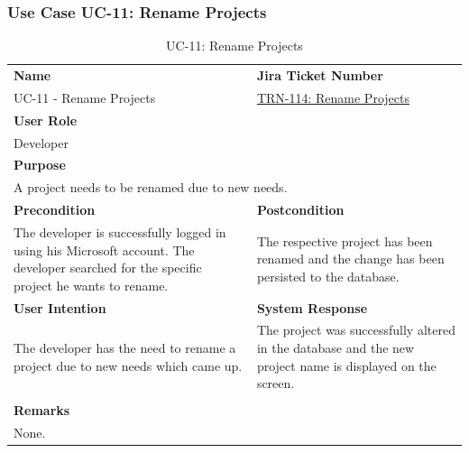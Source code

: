 
\subsubsection{Use Case UC-11: Rename Projects}\label{subsubsec:use-case-uc-11:-rename-project}

\begin{table}[H]
    \centering
    \begin{tabular}{|p{}|p{}|}

        \hline
        \rowcolor{gray!50}\textbf{Name} & \rowcolor{gray!50}\textbf{Jira Ticket Number} \\
        UC-11 - Rename Projects
        &
        \href{https://fh-burgenland.atlassian.net/browse/TRN-114}{TRN-114: Rename Projects} \\ \hline

        \multicolumn{2}{|l|}{\rowcolor{gray!50}\textbf{User Role}} \\
        \multicolumn{2}{|l|}{Developer} \\ \hline

        \multicolumn{2}{|l|}{\rowcolor{gray!50}\textbf{Purpose}} \\
        \multicolumn{2}{|p{1\textwidth}|}{A project needs to be renamed due to new needs.} \\ \hline

        \rowcolor{gray!50}\textbf{Precondition} & \rowcolor{gray!50}\textbf{Postcondition} \\
        The developer is successfully logged in using his Microsoft account.
        The developer searched for the specific project he wants to rename.
        &
        The respective project has been renamed and the change has been persisted to the database.\\ \hline

        \rowcolor{gray!50}\textbf{User Intention} & \rowcolor{gray!50}\textbf{System Response} \\
        The developer has the need to rename a project due to new needs which came up.
        &
        The project was successfully altered in the database and the new project name is displayed on the screen. \\ \hline

        & \\ \hline

        \multicolumn{2}{|l|}{\rowcolor{gray!50}\textbf{Remarks}} \\
        \multicolumn{2}{|p{1\textwidth}|}{None.} \\ \hline
    \end{tabular}
    \caption{UC-11: Rename Projects}
    \label{tab:uc-rename-projects}
\end{table}

